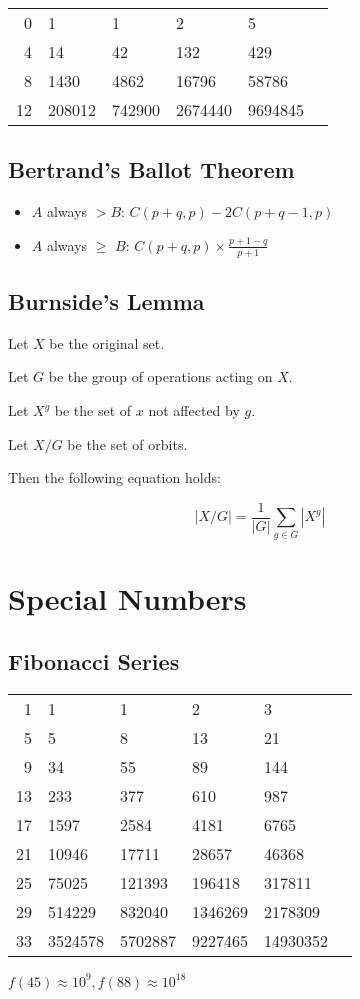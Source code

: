 \documentclass[a4paper,10pt,twocolumn,oneside]{article}
\begin{document}
\begin{center}
    \begin{tabular}{r|lllll}
        0 & 1 & 1 & 2 & 5 \\
        4 & 14 & 42 & 132 & 429 \\
        8 & 1430 & 4862 & 16796 & 58786 \\
        12 & 208012 & 742900 & 2674440 & 9694845
    \end{tabular}
\end{center}


\subsection{Bertrand's Ballot Theorem}

\begin{itemize}
    \item $A$ always $> B$: $C(p+q, p) - 2 C(p+q-1, p)$
    \item $A$ always $\geq$ $B$: $C(p+q, p) \times \frac{p + 1 - q}{p + 1}$
\end{itemize}


\subsection{Burnside's Lemma}
{\normalsize
Let $X$ be the original set.

Let $G$ be the group of operations acting on $X$.

Let $X^g$ be the set of $x$ not affected by $g$.

Let $X/G$ be the set of orbits.

Then the following equation holds:

$$
|X/G| = \frac{1}{|G|} \sum_{g \in G} |X^g|
$$
}

\section{Special Numbers}

\subsection{Fibonacci Series}

{\normalsize
\begin{center}
    \begin{tabular}{r|lllll}
        1 & 1 & 1 & 2 & 3 \\
        5 & 5 & 8 & 13 & 21 \\
        9 & 34 & 55 & 89 & 144 \\
        13 & 233 & 377 & 610 & 987 \\
        17 & 1597 & 2584 & 4181 & 6765 \\
        21 & 10946 & 17711 & 28657 & 46368 \\
        25 & 75025 & 121393 & 196418 & 317811 \\
        29 & 514229 & 832040 & 1346269 & 2178309 \\
        33 & 3524578 & 5702887 & 9227465 & 14930352
    \end{tabular}
\end{center}
\noindent
$f(45) \approx 10^9, f(88) \approx 10^{18}$
}
\end{document}
